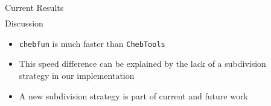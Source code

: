 \documentclass[final]{beamer}
\begin{document}
\begin{frame}{}
\begin{columns}[t]
\begin{column}{.31\linewidth}
\begin{block}{Current Results}
\begin{align*}
\end{align*}
{\color{numhypRed} Discussion}
\begin{itemize}
\item {\tt chebfun} is much faster than {\tt ChebTools}
\item This speed difference can be explained by the lack of a subdivision strategy in our implementation
\item A new subdivision strategy is part of current and future work
\end{itemize}
\end{block}
\end{column}


  \begin{column}{.31\linewidth}

%




\end{column}
\end{columns}
\end{frame}
\end{document}
